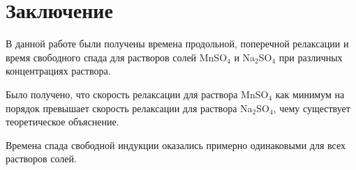 \clearpage
\section{Заключение}
В данной работе были получены времена продольной, поперечной релаксации и время свободного спада для растворов солей MnSO$_4$  и Na$_2$SO$_4$ при различных концентрациях раствора. 

Было получено, что скорость релаксации для раствора MnSO$_4$ как минимум на порядок превышает скорость релаксации для раствора Na$_2$SO$_4$, чему существует теоретическое объяснение.

Времена спада свободной индукции оказались примерно одинаковыми для всех растворов солей.